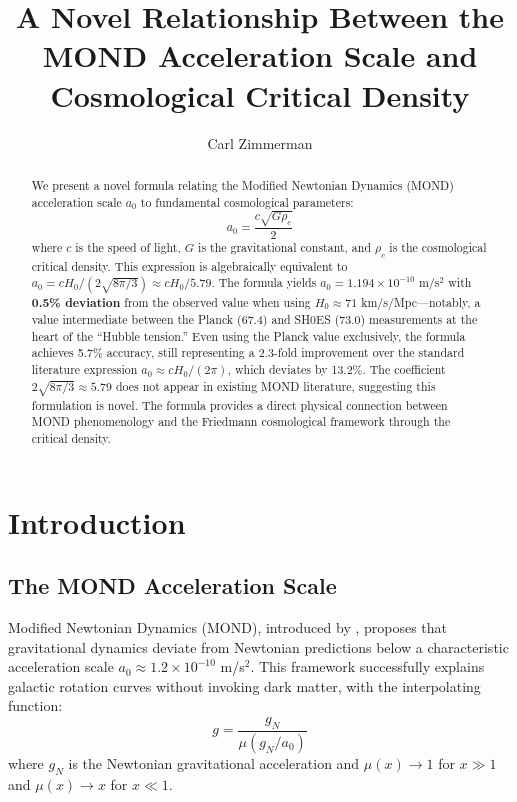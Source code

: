 \documentclass[12pt,preprint]{aastex631}
\begin{document}
\title{A Novel Relationship Between the MOND Acceleration Scale and Cosmological Critical Density}

\author{Carl Zimmerman}
\email{[email]}

\begin{abstract}
We present a novel formula relating the Modified Newtonian Dynamics (MOND) acceleration scale $a_0$ to fundamental cosmological parameters:
\begin{equation*}
a_0 = \frac{c \sqrt{G \rho_c}}{2}
\end{equation*}
where $c$ is the speed of light, $G$ is the gravitational constant, and $\rho_c$ is the cosmological critical density. This expression is algebraically equivalent to $a_0 = cH_0/(2\sqrt{8\pi/3}) \approx cH_0/5.79$. The formula yields $a_0 = 1.194 \times 10^{-10}$ m/s$^2$ with \textbf{0.5\% deviation} from the observed value when using $H_0 \approx 71$ km/s/Mpc---notably, a value intermediate between the Planck (67.4) and SH0ES (73.0) measurements at the heart of the ``Hubble tension.'' Even using the Planck value exclusively, the formula achieves 5.7\% accuracy, still representing a 2.3-fold improvement over the standard literature expression $a_0 \approx cH_0/(2\pi)$, which deviates by 13.2\%. The coefficient $2\sqrt{8\pi/3} \approx 5.79$ does not appear in existing MOND literature, suggesting this formulation is novel. The formula provides a direct physical connection between MOND phenomenology and the Friedmann cosmological framework through the critical density.
\end{abstract}


\section{Introduction}
\label{sec:intro}

\subsection{The MOND Acceleration Scale}

Modified Newtonian Dynamics (MOND), introduced by \citet{Milgrom1983}, proposes that gravitational dynamics deviate from Newtonian predictions below a characteristic acceleration scale $a_0 \approx 1.2 \times 10^{-10}$ m/s$^2$. This framework successfully explains galactic rotation curves without invoking dark matter, with the interpolating function:
\begin{equation}
g = \frac{g_N}{\mu(g_N/a_0)}
\end{equation}
where $g_N$ is the Newtonian gravitational acceleration and $\mu(x) \rightarrow 1$ for $x \gg 1$ and $\mu(x) \rightarrow x$ for $x \ll 1$.
\end{document}
